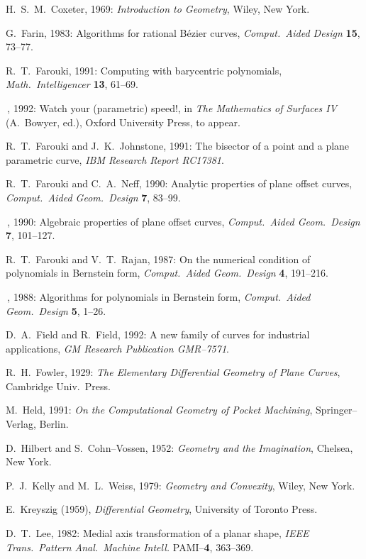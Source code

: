 {{\begin{thebibliography}{99}
H.~S.~M.~Coxeter, 1969: {\it Introduction to Geometry}, Wiley,
New York.

G.~Farin, 1983: Algorithms for rational B\'ezier curves, {\it Comput.\
Aided Design} {\bf 15}, 73--77.

R.~T.~Farouki, 1991: Computing with barycentric polynomials, {\it Math.\
Intelligencer} {\bf 13}, 61--69.

\ldash\,, 1992: Watch your (parametric) speed!, in {\it The Mathematics
of Surfaces IV\/} (A.~Bowyer, ed.), Oxford University Press, to appear.

\bibitem{farouki91b}
R.~T.~Farouki and J.~K.~Johnstone, 1991: The bisector of a point and
a plane parametric curve, {\it IBM Research Report RC17381}.

R.~T.~Farouki and C.~A.~Neff, 1990: Analytic properties of plane
offset curves, {\it Comput.\ Aided Geom.\ Design} {\bf 7}, 83--99.

\bibitem{farouki90b}
\ldash\,, 1990: Algebraic properties of plane offset curves,
{\it Comput.\ Aided Geom.\ Design} {\bf 7}, 101--127.

R.~T.~Farouki and V.~T.~Rajan, 1987: On the numerical condition of
polynomials in Bernstein form, {\it Comput.\ Aided Geom.\ Design}
{\bf 4}, 191--216.

\ldash\,, 1988: Algorithms for polynomials in Bernstein form,
{\it Comput.\ Aided Geom.\ Design} {\bf 5}, 1--26.

D.~A.~Field and R.~Field, 1992: A new family of curves for industrial
applications, {\it GM Research Publication GMR--7571}.

R.~H.~Fowler, 1929: {\it The Elementary Differential Geometry of
Plane Curves}, Cambridge Univ.\ Press.

M.~Held, 1991: {\it On the Computational Geometry of Pocket Machining},
Springer--Verlag, Berlin.

D.~Hilbert and S.~Cohn--Vossen, 1952: {\it Geometry and the Imagination},
Chelsea, New York.

P.~J.~Kelly and M.~L.~Weiss, 1979: {\it Geometry and Convexity}, Wiley,
New York.

E.~Kreyszig (1959), {\it Differential Geometry}, University of Toronto
Press.

D.~T.~Lee, 1982: Medial axis transformation of a planar shape, {\it IEEE
Trans.\ Pattern Anal.\ Machine Intell.} PAMI--{\bf 4}, 363--369.


\end{thebibliography}}}
